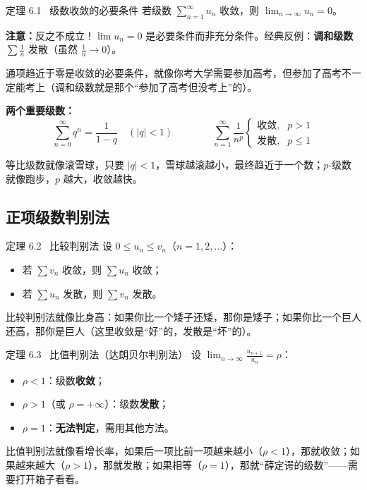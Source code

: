 \documentclass[12pt,a4paper]{article}
\newcommand{\redtext}[1]{{\color{MainRed}\textbf{#1}}}
\newcommand{\greentext}[1]{{\color{MintGreen}\textbf{#1}}}
\newcommand{\orangetext}[1]{{\color{Coral}\textbf{#1}}}
\newcommand{\humor}[1]{\par\smallskip\begin{humorbox}#1\end{humorbox}\smallskip}
\begin{document}
\begin{thmbox}{定理 6.1 \ 级数收敛的必要条件}
若级数 $\displaystyle\sum_{n=1}^{\infty} u_n$ 收敛，则 $\displaystyle\lim_{n\to\infty} u_n = 0$。

\medskip
\textbf{注意：}反之不成立！$\lim u_n = 0$ 是必要条件而非充分条件。经典反例：\redtext{调和级数} $\sum \frac{1}{n}$ 发散（虽然 $\frac{1}{n} \to 0$）。
\end{thmbox}
\humor{通项趋近于零是收敛的必要条件，就像你考大学需要参加高考，但参加了高考不一定能考上（调和级数就是那个“参加了高考但没考上”的）。}

\begin{formulaframe}
\centering
\textbf{两个重要级数：}
\[
\sum_{n=0}^{\infty} q^n = \frac{1}{1-q} \quad (|q| < 1) \qquad\qquad \sum_{n=1}^{\infty} \frac{1}{n^p} \begin{cases} \text{收敛}, & p > 1 \\ \text{发散}, & p \leqslant 1 \end{cases}
\]
\end{formulaframe}
\humor{等比级数就像滚雪球，只要 $|q|<1$，雪球越滚越小，最终趋近于一个数；$p$-级数就像跑步，$p$ 越大，收敛越快。}

\subsection{正项级数判别法}

\begin{thmbox}{定理 6.2 \ 比较判别法}
设 $0 \leqslant u_n \leqslant v_n$（$n = 1, 2, \ldots$）：
\begin{itemize}[leftmargin=2em, itemsep=2pt]
  \item 若 $\sum v_n$ 收敛，则 $\sum u_n$ 收敛；
  \item 若 $\sum u_n$ 发散，则 $\sum v_n$ 发散。
\end{itemize}
\end{thmbox}
\humor{比较判别法就像比身高：如果你比一个矮子还矮，那你是矮子；如果你比一个巨人还高，那你是巨人（这里收敛是“好”的，发散是“坏”的）。}

\begin{thmbox}{定理 6.3 \ 比值判别法（达朗贝尔判别法）}
设 $\displaystyle\lim_{n\to\infty} \frac{u_{n+1}}{u_n} = \rho$：
\begin{itemize}[leftmargin=2em, itemsep=2pt]
  \item $\rho < 1$：级数\greentext{收敛}；
  \item $\rho > 1$（或 $\rho = +\infty$）：级数\redtext{发散}；
  \item $\rho = 1$：\orangetext{无法判定}，需用其他方法。
\end{itemize}
\end{thmbox}
\humor{比值判别法就像看增长率，如果后一项比前一项越来越小（$\rho<1$），那就收敛；如果越来越大（$\rho>1$），那就发散；如果相等（$\rho=1$），那就“薛定谔的级数”——需要打开箱子看看。}
\end{document}
